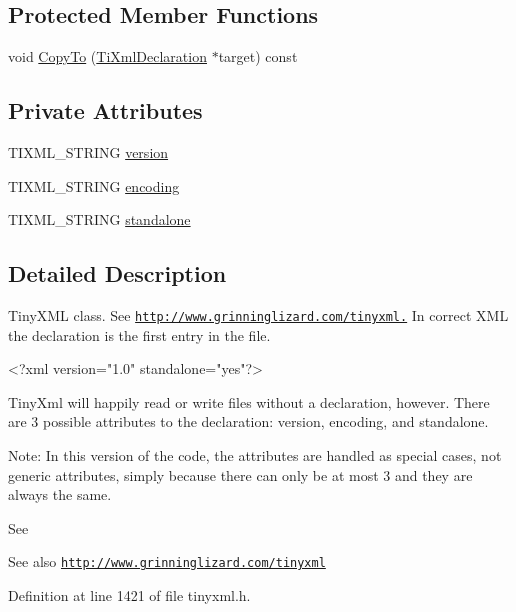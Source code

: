 \subsection*{Protected Member Functions}
\begin{DoxyCompactItemize}
\item 
void \hyperlink{class_ti_xml_declaration_a9d08959f935421a593032bd3efb30c38}{CopyTo} (\hyperlink{class_ti_xml_declaration}{TiXmlDeclaration} $\ast$target) const 
\end{DoxyCompactItemize}
\subsection*{Private Attributes}
\begin{DoxyCompactItemize}
\item 
TIXML\_\-STRING \hyperlink{class_ti_xml_declaration_ab9eb14dc9cb78e3a8a0636d5d6a5d04d}{version}
\item 
TIXML\_\-STRING \hyperlink{class_ti_xml_declaration_a24b8645d7696ec169bbb3fb7d30860cf}{encoding}
\item 
TIXML\_\-STRING \hyperlink{class_ti_xml_declaration_a52524bf1a0726104350fe4121d7fdff4}{standalone}
\end{DoxyCompactItemize}


\subsection{Detailed Description}
TinyXML class. See \href{http://www.grinninglizard.com/tinyxml.}{\tt http://www.grinninglizard.com/tinyxml.} In correct XML the declaration is the first entry in the file. \begin{DoxyVerb}
    <?xml version="1.0" standalone="yes"?>
    \end{DoxyVerb}


TinyXml will happily read or write files without a declaration, however. There are 3 possible attributes to the declaration: version, encoding, and standalone.

Note: In this version of the code, the attributes are handled as special cases, not generic attributes, simply because there can only be at most 3 and they are always the same.

See \begin{DoxySeeAlso}{See also}
\href{http://www.grinninglizard.com/tinyxml}{\tt http://www.grinninglizard.com/tinyxml} 
\end{DoxySeeAlso}


Definition at line 1421 of file tinyxml.h.

